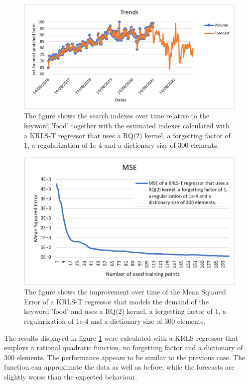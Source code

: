 \begin{figure}[H]
	\centering
	\includegraphics[scale=0.6]{img/exp3.png}
	\caption{The figure shows the search indexes over time relative to the keyword 'food' together with the estimated indexes calculated with a KRLS-T regressor that uses a RQ(2) kernel, a forgetting factor of 1, a regularization of 1e-4 and a dictionary size of 300 elements.}
	\label{Implementation:Trends 3}
\end{figure} 

\begin{figure}[H]
	\centering
	\includegraphics[scale=0.7]{img/exp3_mse.png}
	\caption{The figure shows the improvement over time of the Mean Squared Error of a KRLS-T regressor that models the demand of the keyword 'food' and uses a RQ(2) kernel, a forgetting factor of 1, a regularization of 1e-4 and a dictionary size of 300 elements.}
	\label{Implementation:MSE 3}
\end{figure} 

\newpage
The results displayed in figure \ref{Implementation:Trends 3} were calculated with a \ac{KRLS} regressor that employs a rational quadratic function, no forgetting factor and a dictionary of 300 elements. The performance appears to be similar to the previous case. The function can approximate the data as well as before, while the forecasts are slightly worse than the expected behaviour.


